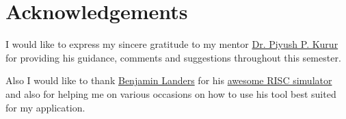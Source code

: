 \chapter*{\centering Acknowledgements}
\quad I would like to express my sincere gratitude to my mentor \href{https://iitpkd.ac.in/people/ppk}{Dr. Piyush P. Kurur} for providing his guidance, comments and suggestions throughout this semester. 

Also I would like to thank \href{https://github.com/TheThirdOne}{Benjamin Landers} for his \href{https://github.com/TheThirdOne/rars}{awesome RISC simulator} and also for helping me on various occasions on how to use his tool best suited for my application.

